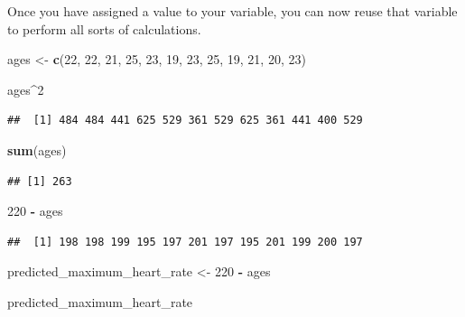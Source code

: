 \documentclass[
]{book}
\newenvironment{Shaded}{\begin{snugshade}}{\end{snugshade}}
\newcommand{\DecValTok}[1]{\textcolor[rgb]{0.00,0.00,0.81}{#1}}
\newcommand{\FunctionTok}[1]{\textcolor[rgb]{0.13,0.29,0.53}{\textbf{#1}}}
\newcommand{\NormalTok}[1]{#1}
\newcommand{\OtherTok}[1]{\textcolor[rgb]{0.56,0.35,0.01}{#1}}
\newcommand{\SpecialCharTok}[1]{\textcolor[rgb]{0.81,0.36,0.00}{\textbf{#1}}}
\begin{document}
Once you have assigned a value to your variable, you can now reuse that variable to perform all sorts of calculations.

\begin{Shaded}
\begin{Highlighting}[]
\NormalTok{ages }\OtherTok{\textless{}{-}} \FunctionTok{c}\NormalTok{(}\DecValTok{22}\NormalTok{, }\DecValTok{22}\NormalTok{, }\DecValTok{21}\NormalTok{, }\DecValTok{25}\NormalTok{, }\DecValTok{23}\NormalTok{, }\DecValTok{19}\NormalTok{, }\DecValTok{23}\NormalTok{, }\DecValTok{25}\NormalTok{, }\DecValTok{19}\NormalTok{, }\DecValTok{21}\NormalTok{, }\DecValTok{20}\NormalTok{, }\DecValTok{23}\NormalTok{)}

\NormalTok{ages}\SpecialCharTok{\^{}}\DecValTok{2}
\end{Highlighting}
\end{Shaded}

\begin{verbatim}
##  [1] 484 484 441 625 529 361 529 625 361 441 400 529
\end{verbatim}

\begin{Shaded}
\begin{Highlighting}[]
\FunctionTok{sum}\NormalTok{(ages)}
\end{Highlighting}
\end{Shaded}

\begin{verbatim}
## [1] 263
\end{verbatim}

\begin{Shaded}
\begin{Highlighting}[]
\DecValTok{220} \SpecialCharTok{{-}}\NormalTok{ ages}
\end{Highlighting}
\end{Shaded}

\begin{verbatim}
##  [1] 198 198 199 195 197 201 197 195 201 199 200 197
\end{verbatim}

\begin{Shaded}
\begin{Highlighting}[]
\NormalTok{predicted\_maximum\_heart\_rate }\OtherTok{\textless{}{-}} \DecValTok{220} \SpecialCharTok{{-}}\NormalTok{ ages}

\NormalTok{predicted\_maximum\_heart\_rate}
\end{Highlighting}
\end{Shaded}
\end{document}
